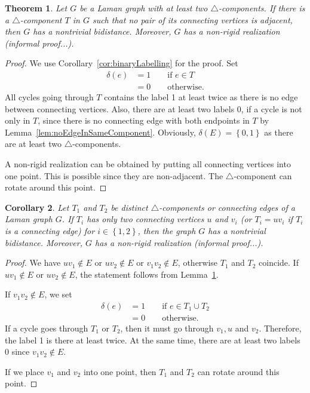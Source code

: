 \documentclass[a4paper, 11pt]{article}
\newcommand{\trcomp}{$\triangle$-component}
\newcommand{\trcomps}{$\triangle$-components}
\newtheorem{thm}{Theorem}[section]
\newtheorem{cor}[thm]{Corollary}
\theoremstyle{definition}
\begin{document}
\begin{thm}
\label{thm:componentWithNonadjacentVertices}
Let $G$ be a Laman graph with at least two \trcomps{}. If there is a \trcomp{} $T$ in $G$ such that no pair of its connecting vertices is adjacent, then $G$ has a nontrivial bidistance.  Moreover, $G$ has a non-rigid realization (informal proof...).
\end{thm}
\begin{proof}
We use Corollary~\ref{cor:binaryLabelling} for the proof. Set 
\begin{align*}
\delta(e)&=1 \qquad \text{if } e\in T \\
		&=0 \qquad \text{otherwise.}
\end{align*} 
All cycles going through $T$ contains the label 1 at least twice as there is no edge between connecting vertices. Also, there are at least two labels 0, if a cycle is not only in $T$, since there is no connecting edge with both endpoints in $T$ by Lemma~\ref{lem:noEdgeInSameComponent}. Obviously, $\delta(E)=\left\{0,1\right\}$ as there are at least two \trcomps{}.

A non-rigid realization can be obtained by putting all connecting vertices into one point. This is possible since they are non-adjacent. The \trcomp{} can rotate around this point.
\end{proof}

\begin{cor}
Let $T_1$ and $T_2$ be distinct \trcomps{} or connecting edges of a Laman graph $G$. If $T_i$ has only two connecting vertices $u$ and $v_i$ (or $T_i=uv_i$ if $T_i$ is a connecting edge) for $i\in\left\{1,2\right\}$, then  the graph $G$ has a nontrivial bidistance.  Moreover, $G$ has a non-rigid realization (informal proof...).
\end{cor}
\begin{proof}
We have $uv_1\notin E$ or $uv_2\notin E$ or $v_1v_2\notin E$, otherwise $T_1$ and $T_2$ coincide.
If $uv_1\notin E$ or $uv_2\notin E$, the statement follows from Lemma~\ref{thm:componentWithNonadjacentVertices}.

If $v_1v_2\notin E$, we set 
\begin{align*}
\delta(e)&=1 \qquad \text{if } e\in T_1\cup T_2 \\
		&=0 \qquad \text{otherwise.}
\end{align*} 
If a cycle goes through $T_1$ or $T_2$, then it must go through  $v_1, u$ and $v_2$. Therefore, the label 1 is there at least twice. At the same time, there are at least two labels 0 since  $v_1v_2\notin E$.

If we place $v_1$ and $v_2$ into one point, then $T_1$ and $T_2$ can rotate around this point.
\end{proof}
\end{document}
